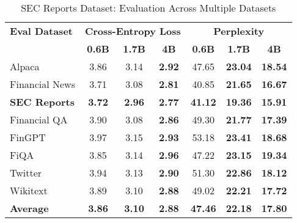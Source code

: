 
\begin{table}[htbp]
\centering
\caption[SEC Reports: Evaluation Results]{SEC Reports Dataset: Evaluation Across Multiple Datasets}
\label{tab:sec_reports_results}
\begin{tabular}{l|ccc|ccc}
\hline
\textbf{Eval Dataset} & \multicolumn{3}{c|}{\textbf{Cross-Entropy Loss}} & \multicolumn{3}{c}{\textbf{Perplexity}} \\
\cline{2-4} \cline{5-7}
  & \textbf{0.6B} & \textbf{1.7B} & \textbf{4B} & \textbf{0.6B} & \textbf{1.7B} & \textbf{4B} \\
\hline
Alpaca & 3.86 & 3.14 & \textbf{2.92} & 47.65 & \textbf{23.04} & \textbf{18.54} \\
Financial News & 3.71 & 3.08 & \textbf{2.81} & 40.85 & \textbf{21.65} & \textbf{16.67} \\
\textbf{SEC Reports} & \textbf{3.72} & \textbf{2.96} & \textbf{2.77} & \textbf{41.12} & \textbf{19.36} & \textbf{15.91} \\
Financial QA & 3.90 & 3.08 & \textbf{2.86} & 49.30 & \textbf{21.77} & \textbf{17.39} \\
FinGPT & 3.97 & 3.15 & \textbf{2.93} & 53.18 & \textbf{23.41} & \textbf{18.68} \\
FiQA & 3.85 & 3.14 & \textbf{2.96} & 47.22 & \textbf{23.15} & \textbf{19.34} \\
Twitter & 3.94 & 3.13 & \textbf{2.90} & 51.30 & \textbf{22.86} & \textbf{18.12} \\
Wikitext & 3.89 & 3.10 & \textbf{2.88} & 49.02 & \textbf{22.21} & \textbf{17.72} \\
\hline
\textbf{Average} & \textbf{3.86} & \textbf{3.10} & \textbf{2.88} & \textbf{47.46} & \textbf{22.18} & \textbf{17.80} \\
\hline
\end{tabular}
\end{table}

